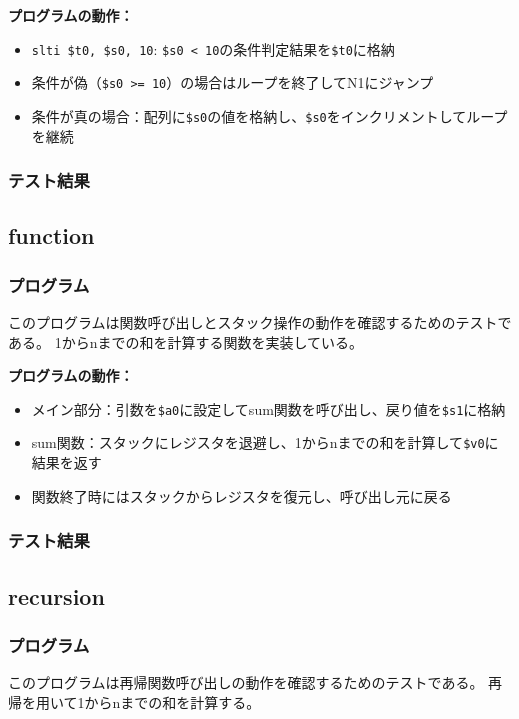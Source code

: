 \documentclass[dvipdfmx]{jsarticle}
\begin{document}
\textbf{プログラムの動作：}
\begin{itemize}
\item \texttt{slti \$t0, \$s0, 10}: \texttt{\$s0 < 10}の条件判定結果を\texttt{\$t0}に格納
\item 条件が偽（\texttt{\$s0 >= 10}）の場合はループを終了してN1にジャンプ
\item 条件が真の場合：配列に\texttt{\$s0}の値を格納し、\texttt{\$s0}をインクリメントしてループを継続
\end{itemize}

\subsubsection{テスト結果}


\subsection{function}
\label{appendix:function}

\subsubsection{プログラム}
このプログラムは関数呼び出しとスタック操作の動作を確認するためのテストである。
1からnまでの和を計算する関数を実装している。



\textbf{プログラムの動作：}
\begin{itemize}
\item メイン部分：引数を\texttt{\$a0}に設定してsum関数を呼び出し、戻り値を\texttt{\$s1}に格納
\item sum関数：スタックにレジスタを退避し、1からnまでの和を計算して\texttt{\$v0}に結果を返す
\item 関数終了時にはスタックからレジスタを復元し、呼び出し元に戻る
\end{itemize}

\subsubsection{テスト結果}


\subsection{recursion}
\label{appendix:recursion}

\subsubsection{プログラム}
このプログラムは再帰関数呼び出しの動作を確認するためのテストである。
再帰を用いて1からnまでの和を計算する。
\end{document}
